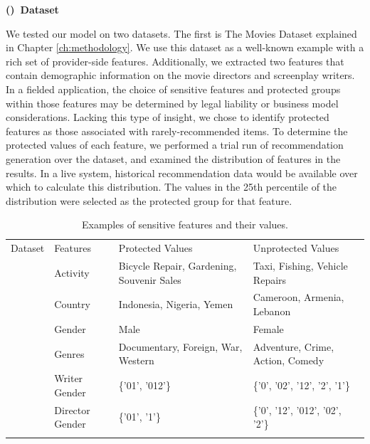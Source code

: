 \vspace{0.25cm}
\noindent \textbf{()~Dataset}
\vspace{0.25cm}

We tested our model on two datasets. The first is The Movies Dataset explained in Chapter \ref{ch:methodology}. We use this dataset as a well-known example with a rich set of provider-side features. Additionally, we extracted two features that contain demographic information on the movie directors and screenplay writers. In a fielded application, the choice of sensitive features and protected groups within those features may be determined by legal liability or business model considerations. Lacking this type of insight, we chose to identify protected features as those associated with rarely-recommended items. To determine the protected values of each feature, we performed a trial run of recommendation generation over the dataset, and examined the distribution of features in the results. In a live system, historical recommendation data would be available over which to calculate this distribution. The values in the 25th percentile of the distribution were selected as the protected group for that feature.


\begin{table}[!hbt]
\small
\centering
    \begin{tabularx}{\textwidth}{!{\vrule width 0.8pt}X!{\vrule width 0.8pt}X!{\vrule width 0.8pt}X!{\vrule width 0.8pt}X!{\vrule width 0.8pt}}
        Dataset & Features & Protected Values & Unprotected Values \\
         & 
        Activity & Bicycle Repair, Gardening, Souvenir Sales & Taxi, Fishing, Vehicle Repairs \\  
        &  Country &  Indonesia, Nigeria, Yemen &  Cameroon, Armenia, Lebanon \\
        & Gender & Male & Female \\
        
         &  Genres &  Documentary, Foreign, War, Western &  Adventure, Crime, Action, Comedy\\ 
        & Writer Gender & \{'01', '012'\} & \{'0', '02', '12', '2', '1'\} \\ 
        & Director Gender & \{'01', '1'\} &  \{'0', '12', '012', '02', '2'\} \\
    \end{tabularx}
    \caption{Examples of sensitive features and their values.}
    \label{table:sensitive_features_table}
\end{table}

